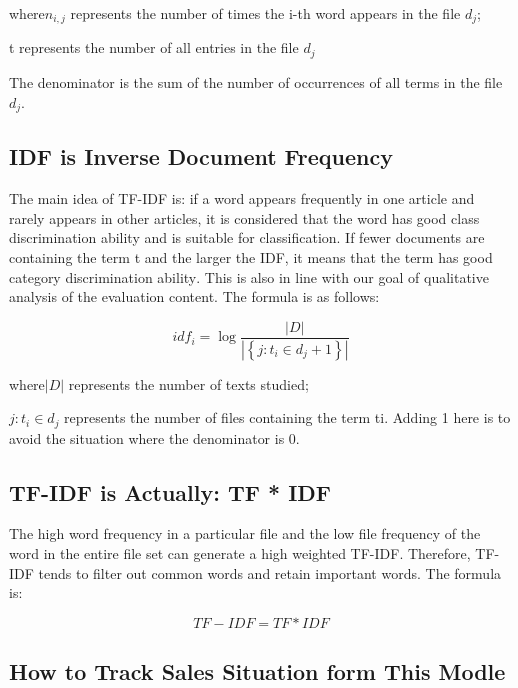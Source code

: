 \documentclass{mcmthesis}
\newcommand{\upcite}[1]{\textsuperscript{\textsuperscript{\cite{#1}}}}
\begin{document}
where\enspace\(n_{i, j}\) represents the number of times the i-th word appears in the file $d_j$;

t represents the number of all entries in the file $d_j$

The denominator is the sum of the number of occurrences of all terms in the file $d_j$.

\subsection{IDF is Inverse Document Frequency}

The main idea of TF-IDF is: if a word appears frequently in one article and rarely appears in other articles, it is considered that the word has good class discrimination ability and is suitable for classification. If fewer documents are containing the term t and the larger the IDF, it means that the term has good category discrimination ability\upcite{Baenagarc2012TF}. This is also in line with our goal of qualitative analysis of the evaluation content. The formula is as follows:

\begin{equation}
i d f_{i}=\log \frac{|D|}{\left|\left\{j: t_{i} \in d_{j}+1\right\}\right|}
\end{equation}

where\enspace\(|D|\) represents the number of texts studied;

$j: t_{i} \in d_ {j}$ represents the number of files containing the term ti. Adding 1 here is to avoid the situation where the denominator is 0.

\subsection{TF-IDF is Actually: TF * IDF}

The high word frequency in a particular file and the low file frequency of the word in the entire file set can generate a high weighted TF-IDF. Therefore, TF-IDF tends to filter out common words and retain important words. The formula is:

\begin{equation}
TF-I D F=T F * I D F
\end{equation}

\subsection{How to Track Sales Situation form This Modle}
\end{document}
